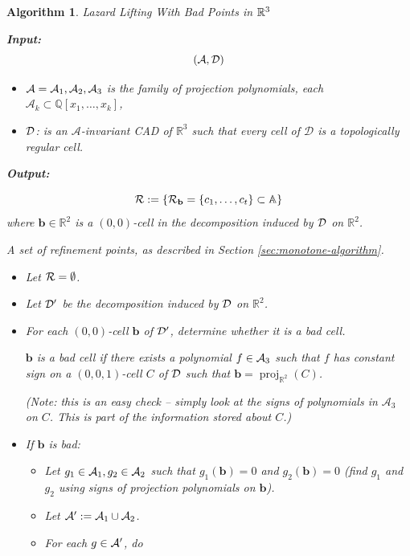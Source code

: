 \documentclass[
]{book}
\newtheorem{algorithm}{Algorithm}
\theoremstyle{definition}
\theoremstyle{definition}
\theoremstyle{definition}
\theoremstyle{definition}
\theoremstyle{remark}
\begin{document}
\begin{algorithm}Lazard Lifting With Bad Points in $\mathbb{R}^3$

\citep[Algorithm 5.15]{lazard10}

\textbf{Input:}
\[({\cal A}, {\cal D})\]

\begin{itemize}
\item
  \({\cal A} = {\cal A}_1,{\cal A}_2,{\cal A}_3\) is the family of projection polynomials, each \(\mathcal{A}_k \subset \mathbb{Q}[x_1,\ldots,x_k]\),
\item
  \(\cal D\): is an \(\mathcal{A}\)-invariant CAD of \(\mathbb{R}^3\) such that every cell of \(\mathcal{D}\) is a topologically regular cell.
\end{itemize}

\textbf{Output:}

\[
{\cal R} := \{ {\cal R}_{\mathbf{b}} = \{ c_1,\ldots,c_t \} \subset \mathbb{A}\}
\]
where \(\mathbf{b}\in \mathbb{R}^{2}\) is a \((0,0)\)-cell in the decomposition induced by \(\cal D\) on \(\mathbb{R}^2\).

A set of refinement points, as described in Section \ref{sec:monotone-algorithm}.

\begin{itemize}
\item
  Let \({\cal R} = \emptyset\).
\item
  Let \(\cal D'\) be the decomposition induced by \(\cal D\) on \(\mathbb{R}^2\).
\item
  For each \((0,0)\)-cell \(\mathbf{b}\) of \(\cal D'\), determine whether it is a bad cell.

  \(\mathbf{b}\) is a bad cell if there exists a polynomial \(f \in {\cal A}_3\) such that \(f\) has constant sign on a \((0,0,1)\)-cell \(C\) of \(\cal D\) such that \(\mathbf{b} = {\operatorname{proj}_{\mathbb{R}^{2}}}(C)\).

  (Note: this is an easy check -- simply look at the signs of polynomials in \(\mathcal{A}_3\) on \(C\). This is part of the information stored about \(C\).)
\item
  If \(\mathbf{b}\) is bad:

  \begin{itemize}
  \item
    Let \(g_1 \in {\cal A}_1, g_2 \in {\cal A}_2\) such that \(g_1(\mathbf{b}) = 0\) and \(g_2(\mathbf{b}) = 0\) (find \(g_1\) and \(g_2\) using signs of projection polynomials on \(\mathbf{b}\)).
  \item
    Let \({\cal A'} := {\cal A}_1 \cup {\cal A}_2\).
  \item
    For each \(g \in {\cal A'}\), do


\end{itemize}
\end{itemize}
\end{algorithm}
\end{document}
